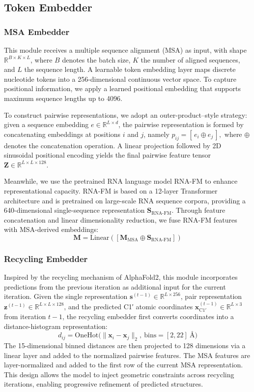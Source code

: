 \subsection{Token Embedder}
\subsubsection{MSA Embedder}

This module receives a multiple sequence alignment (MSA) as input, with shape $\mathbb{R}^{B \times K \times L}$, where $B$ denotes the batch size, $K$ the number of aligned sequences, and $L$ the sequence length. A learnable token embedding layer maps discrete nucleotide tokens into a 256-dimensional continuous vector space. To capture positional information, we apply a learned positional embedding that supports maximum sequence lengths up to 4096.

To construct pairwise representations, we adopt an outer-product–style strategy: given a sequence embedding $e \in \mathbb{R}^{L \times d}$, the pairwise representation is formed by concatenating embeddings at positions $i$ and $j$, namely
$p_{ij} = [\, e_i \oplus e_j \,],$
where $\oplus$ denotes the concatenation operation. A linear projection followed by 2D sinusoidal positional encoding yields the final pairwise feature tensor $\mathbf{Z} \in \mathbb{R}^{L \times L \times 128}$.

Meanwhile, we use the pretrained RNA language model RNA-FM to enhance representational capacity\cite{Chen2022RNAFM}. RNA-FM is based on a 12-layer Transformer architecture and is pretrained on large-scale RNA sequence corpora, providing a 640-dimensional single-sequence representation $\mathbf{S}_{\text{RNA-FM}}$. Through feature concatenation and linear dimensionality reduction, we fuse RNA-FM features with MSA-derived embeddings:
$$\mathbf{M} = \text{Linear}\left([\mathbf{M}_{\text{MSA}} \oplus \mathbf{S}_{\text{RNA-FM}}]\right)$$

\subsubsection{Recycling Embedder}
Inspired by the recycling mechanism of AlphaFold2, this module incorporates predictions from the previous iteration as additional input for the current iteration. Given the single representation $\mathbf{s}^{(t-1)} \in \mathbb{R}^{L \times 256}$, pair representation $\mathbf{z}^{(t-1)} \in \mathbb{R}^{L \times L \times 128}$, and the predicted C1′ atomic coordinates $\mathbf{x}^{(t-1)}_{\text{C1}'} \in \mathbb{R}^{L \times 3}$ from iteration $t-1$, the recycling embedder first converts coordinates into a distance-histogram representation:
$$d_{ij} = \text{OneHot}\bigl(\|\mathbf{x}_i - \mathbf{x}_j\|_2,\ \text{bins} = [2, 22]\ \text{\AA}\bigr)$$
The 15-dimensional binned distances are then projected to 128 dimensions via a linear layer and added to the normalized pairwise features. The MSA features are layer-normalized and added to the first row of the current MSA representation.
This design allows the model to inject geometric constraints across recycling iterations, enabling progressive refinement of predicted structures.

